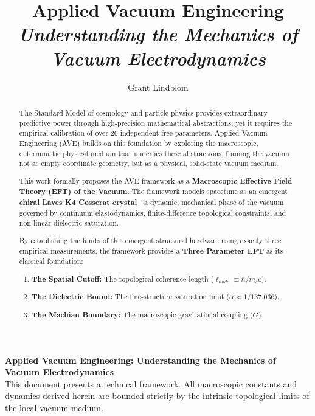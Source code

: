 \title{\textbf{Applied Vacuum Engineering} \\ \large \textit{Understanding the Mechanics of Vacuum Electrodynamics}}
\author{Grant Lindblom}
\date{}

\maketitle

\vfill
\noindent\textbf{Applied Vacuum Engineering: Understanding the Mechanics of Vacuum Electrodynamics} \\
This document presents a technical framework. All macroscopic constants and dynamics derived herein are bounded strictly by the intrinsic topological limits of the local vacuum medium.

\begin{abstract}
    The Standard Model of cosmology and particle physics provides extraordinary predictive power through high-precision mathematical abstractions, yet it requires the empirical calibration of over 26 independent free parameters. Applied Vacuum Engineering (AVE) builds on this foundation by exploring the macroscopic, deterministic physical medium that underlies these abstractions, framing the vacuum not as empty coordinate geometry, but as a physical, solid-state vacuum medium.

    This work formally proposes the AVE framework as a \textbf{Macroscopic Effective Field Theory (EFT) of the Vacuum}. The framework models spacetime as an emergent \textbf{chiral Laves K4 Cosserat crystal}---a dynamic, mechanical phase of the vacuum governed by continuum elastodynamics, finite-difference topological constraints, and non-linear dielectric saturation.

    By establishing the limits of this emergent structural hardware using exactly three empirical measurements, the framework provides a \textbf{Three-Parameter EFT} as its classical foundation:
    \begin{enumerate}
        \item \textbf{The Spatial Cutoff:} The topological coherence length ($\ell_{node} \equiv \hbar / m_e c$).
        \item \textbf{The Dielectric Bound:} The fine-structure saturation limit ($\alpha \approx 1/137.036$).
        \item \textbf{The Machian Boundary:} The macroscopic gravitational coupling ($G$).
    \end{enumerate}


\end{abstract}
